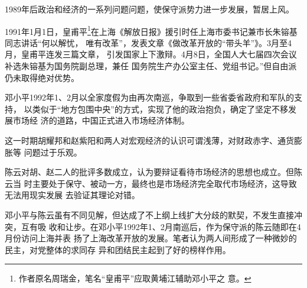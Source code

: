 1989年后政治和经济的一系列问题问题，使保守派势力进一步发展，暂居上风。

1991年1月1日，皇甫平\footnote{作者原名周瑞金，笔名“皇甫平”应取黄埔江辅助邓小平之
  意。}在上海《解放日报》援引时任上海市委书记兼市长朱镕基同志讲话“何以解忧，
唯有改革”，发表文章《做改革开放的“带头羊”》。3月至4月，皇甫平连发三篇文章，
引发国家上下激辩。4月8日，全国人大七届四次会议补选朱镕基为国务院副总理，兼任
国务院生产办公室主任、党组书记。”但自由派仍未取得绝对优势。

邓小平1992年1、2月以全家度假为由再次南巡，争取到一些省委省政府和军队的支持，
以类似于“地方包围中央”的方式，实现了他的政治抱负，确定了坚定不移发展市场经
济的道路，中国正式进入市场经济体制。

这一时期胡耀邦和赵紫阳和两人对宏观经济的认识可谓浅薄，对财政赤字、通货膨胀等
问题过于乐观。

陈云对胡、赵二人的批评多数成立，认为要辩证看待市场经济的思想也成立。但陈云当
时主要处于保守、被动一方，最终也是市场经济完全取代市场经济，这导致无法用现实发展
去验证其理论对错。


邓小平与陈云虽有不同见解，但达成了不上纲上线扩大分歧的默契，不发生直接冲突，互有吸
收和让步。在邓小平1992年1、2月南巡后，作为保守派的陈云随即在4月份访问上海并表
扬了上海改革开放的发展。笔者认为两人间形成了一种微妙的民主，对党整体的求同存
异和团结民主起到了好的榜样作用。





